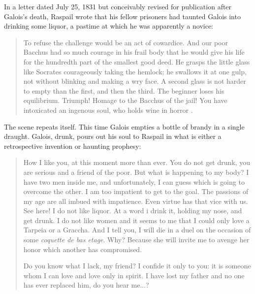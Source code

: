 \documentclass[12pt]{article}
\begin{document}
In a letter dated July 25, 1831 but conceivably revised for publication after Galois's death, Raspail wrote that his fellow prisoners had taunted Galois into drinking some liquor, a pastime at which he was apparently a novice:

\begin{quote}
To refuse the challenge would be an act of cowardice. And our poor Bacchus had so much courage in his frail body that he would give his life for the hundredth part of the smallest good deed. He grasps the little glass like Socrates courageously taking the hemlock; he swallows it at one gulp, not without blinking and making a wry face. A second glass is not harder to empty than the first, and then the third. The beginner loses his equilibrium. Triumph! Homage to the Bacchus of the jail! You have intoxicated an ingenous soul, who holds wine in horror \cite{62}.
\end{quote}

The scene repeats itself. This time Galois empties a bottle of brandy in a single draught. Galois, drunk, pours out his soul to Raspail in what is either a retrospective invention or haunting prophesy:

\begin{quotation}
How I like you, at this moment more than ever. You do not get drunk, you are serious and a friend of the poor. But what is happening to my body? I have two men inside me, and unfortunately, I can guess which is going to overcome the other. I am too impatient to get to the goal. The passions of my age are all imbued with impatience. Even virtue has that vice with us. See here! I do not like liquor. At a word i drink it, holding my nose, and get drunk. I do not like women and it seems to me that I could only love a Tarpeia or a Graccha. And I tell you, I will die in a duel on the occasion of some {\it coquette de bas etage}. Why? Because she will invite me to avenge her honor which another has compromised. 

Do you know what I lack, my friend? I confide it only to you: it is someone whom I can love and love only in spirit. I have lost my father and no one has ever replaced him, do you hear me...? \cite{63}

\end{quotation}
\end{document}
